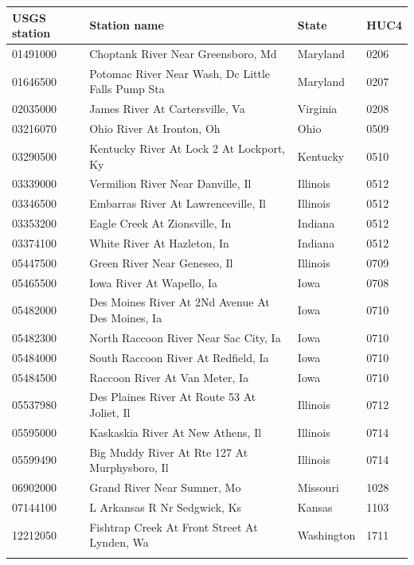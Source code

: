 \documentclass[lineno,pdflatex,sn-apa]{sn-jnl}%
\theoremstyle{thmstyleone}%
\theoremstyle{thmstyletwo}%
\theoremstyle{thmstylethree}%
\begin{document}
\begin{center}
\footnotesize
\setlength{\tabcolsep}{2pt}
\begin{tabular}{@{}p{}p{}p{}p{}@{}}
\toprule
USGS station & Station name & State & HUC4\\
\midrule
01491000 & Choptank River Near Greensboro, Md & Maryland & 0206\\
01646500 & Potomac River Near Wash, Dc Little Falls Pump Sta & Maryland & 0207\\
02035000 & James River At Cartersville, Va & Virginia & 0208\\
03216070 & Ohio River At Ironton, Oh & Ohio & 0509\\
03290500 & Kentucky River At Lock 2 At Lockport, Ky & Kentucky & 0510\\
03339000 & Vermilion River Near Danville, Il & Illinois & 0512\\
03346500 & Embarras River At Lawrenceville, Il & Illinois & 0512\\
03353200 & Eagle Creek At Zionsville, In & Indiana & 0512\\
03374100 & White River At Hazleton, In & Indiana & 0512\\
05447500 & Green River Near Geneseo, Il & Illinois & 0709\\
05465500 & Iowa River At Wapello, Ia & Iowa & 0708\\
05482000 & Des Moines River At 2Nd Avenue At Des Moines, Ia & Iowa & 0710\\
05482300 & North Raccoon River Near Sac City, Ia & Iowa & 0710\\
05484000 & South Raccoon River At Redfield, Ia & Iowa & 0710\\
05484500 & Raccoon River At Van Meter, Ia & Iowa & 0710\\
05537980 & Des Plaines River At Route 53 At Joliet, Il & Illinois & 0712\\
05595000 & Kaskaskia River At New Athens, Il & Illinois & 0714\\
05599490 & Big Muddy River At Rte 127 At Murphysboro, Il & Illinois & 0714\\
06902000 & Grand River Near Sumner, Mo & Missouri & 1028\\
07144100 & L Arkansas R Nr Sedgwick, Ks & Kansas & 1103\\
12212050 & Fishtrap Creek At Front Street At Lynden, Wa & Washington & 1711\\
\botrule
\end{tabular}
\end{center}
\end{document}
